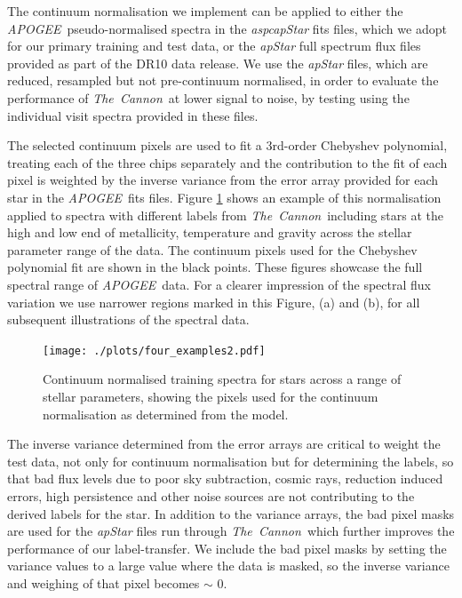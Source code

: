 \documentclass[12pt, preprint]{aastex}
\newcommand{\tc}{\textsl{The~Cannon}}
\newcommand{\apogee}{\textsl{APOGEE}}
\begin{document}
The continuum normalisation we implement can be applied to either the \apogee\ pseudo-normalised spectra in the \textit{aspcapStar} fits files, which we adopt for our primary training and test data, or the \textit{apStar} full spectrum flux files provided as part of the DR10 data release. We use the \textit{apStar} files, which are reduced, resampled but not pre-continuum normalised, in order to evaluate the performance of \tc\ at lower signal to noise, by testing using the individual visit spectra provided in these files.  

The selected continuum pixels are used to fit a 3rd-order Chebyshev polynomial, treating each of the three chips separately and the contribution to the fit of each pixel is weighted by the inverse variance from the error array provided for each star in the \apogee\ fits files. Figure \ref{fig:norm} shows an example of this normalisation applied to spectra with different labels from \tc\, including stars at the high and low end of metallicity, temperature and gravity across the stellar parameter range of the data. The continuum pixels used for the Chebyshev polynomial fit are shown in the black points. These figures showcase the full spectral range of \apogee\ data. For a clearer impression of the spectral flux variation we use narrower regions marked in this Figure, (a) and (b), for all subsequent illustrations of the spectral data. 

\begin{figure}[h!]
  \texttt{[image: ./plots/four\_examples2.pdf]}
\caption{Continuum normalised training spectra for stars across a range of stellar parameters, showing the pixels used for the continuum normalisation as determined from the model.}
\label{fig:norm}
\end{figure}


The inverse variance determined from the error arrays are critical to weight the test data, not only for continuum normalisation but for determining the labels, so that bad flux levels due to poor sky subtraction, cosmic rays, reduction induced errors, high persistence and other noise sources are not contributing to the derived labels for the star. In addition to the variance arrays, the bad pixel masks are used for the \textit{apStar} files run through \tc\, which further improves the performance of our label-transfer. We include the bad pixel masks by setting the variance values to a large value where the data is masked, so the inverse variance and weighing of that pixel becomes $\sim$ 0. 
\end{document}
